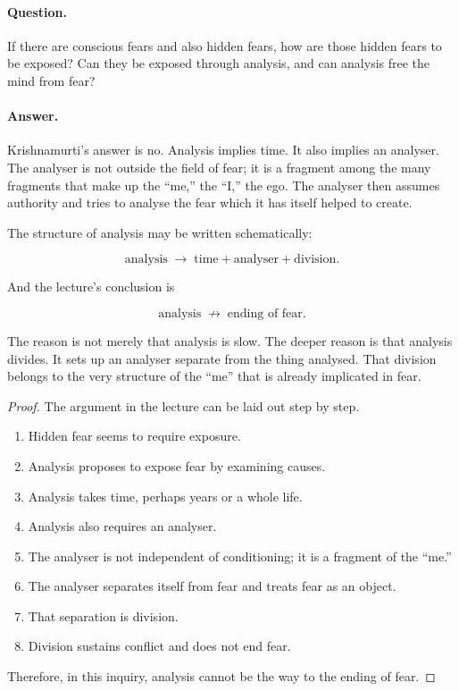 \paragraph{Question.} If there are conscious fears and also hidden fears, how are those hidden fears to be exposed? Can they be exposed through analysis, and can analysis free the mind from fear?

\paragraph{Answer.} Krishnamurti's answer is no. Analysis implies time. It also implies an analyser. The analyser is not outside the field of fear; it is a fragment among the many fragments that make up the ``me,'' the ``I,'' the ego. The analyser then assumes authority and tries to analyse the fear which it has itself helped to create.

The structure of analysis may be written schematically:

\begin{equation}
\text{analysis}
\;\longrightarrow\;
\text{time} + \text{analyser} + \text{division}.
\end{equation}

And the lecture's conclusion is

\begin{equation}
\text{analysis}
\;\not\longrightarrow\;
\text{ending of fear}.
\end{equation}

The reason is not merely that analysis is slow. The deeper reason is that analysis divides. It sets up an analyser separate from the thing analysed. That division belongs to the very structure of the ``me'' that is already implicated in fear.

\begin{proof}
The argument in the lecture can be laid out step by step.
\begin{enumerate}
\item Hidden fear seems to require exposure.
\item Analysis proposes to expose fear by examining causes.
\item Analysis takes time, perhaps years or a whole life.
\item Analysis also requires an analyser.
\item The analyser is not independent of conditioning; it is a fragment of the ``me.''
\item The analyser separates itself from fear and treats fear as an object.
\item That separation is division.
\item Division sustains conflict and does not end fear.
\end{enumerate}
Therefore, in this inquiry, analysis cannot be the way to the ending of fear.
\end{proof}

